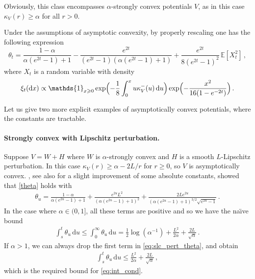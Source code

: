 \documentclass[12pt]{article}
\newcommand{\1}{\mathds{1}}
\newcommand*{\rd}{\mathrm{d}}
\newcommand*{\dd}{\, \rd}
\renewcommand{\geq}{\geqslant}
\renewcommand{\leq}{\leqslant}
\theoremstyle{plain}
\theoremstyle{definition}
\theoremstyle{remark}
\begin{document}
Obviously, this class encompasses $\alpha$-strongly convex potentials $V$, as in this case $\kappa_V(r) \geq \alpha$ for all $r > 0$.


Under the assumptions of asymptotic convexity, by properly rescaling \cite[Proposition 2.9]{chaintron_propagation_2025} one has the following expression
\[
\theta_t = \frac{1-\alpha}{\alpha(e^{2t}-1)+1} -\frac{e^{2t}}{(e^{2t}-1)(\alpha(e^{2t}-1)+1)} +\frac{e^{2t}}{8 (e^{2t}-1)^2}\, \mathbb{E}[X_t^2]\,,
\]
where $X_t$ is a random variable with density
$$\xi_t ({\rm d}x) \propto \mathds{1}_{x \geq 0} \exp \Bigl( -\frac{1}{8} \int_0^{x} u\kappa_{V}^- (u) \dd u \Bigr) \exp \Bigl( -\frac{x^2}{16 (1-e^{-2t})} \Bigr)\,. $$


Let us give two more explicit examples of asymptotically convex potentials, where the constants are tractable.

\paragraph{Strongly convex with Lipschitz perturbation.}
Suppose $V = W + H$ where $W$ is $\alpha$-strongly convex and $H$ is a smooth $L$-Lipschitz perturbation. In this case
$
\kappa_V(r) \geq \alpha - 2L/r
$
for $r\geq 0$, so $V$ is asymptotically convex.
\cite{BriPed25HeatFlow}, see also \cite{chaintron_propagation_2025} for a slight improvement of some absolute constants, showed that \eqref{theta} holds with 
\begin{align}\label{eq:slc_pert_theta}
    \theta_u = \frac{1-\alpha}{\alpha(e^{2u}-1)+1} + \frac{e^{2u}L^2}{(\alpha(e^{2u}-1)+1)^2}+ \frac{2Le^{2u}}{(\alpha(e^{2u}-1)+1)^{3/2}\sqrt{e^{2u}-1}}\,.
\end{align}
In the case where $\alpha \in (0,1]$, all these terms are positive and so we have the na\"{\i}ve bound
\begin{align*}
    \int_s^t \theta_u \dd u \leq \int_0^\infty \theta_u \dd u = \frac{1}{2}\log(\alpha^{-1}) + \frac{L^2}{2\alpha} + \frac{2L}{\sqrt{\alpha}}\,.
\end{align*}
If $\alpha > 1$, we can always drop the first term in \eqref{eq:slc_pert_theta}, and obtain
\begin{align*}
    \int_s^t \theta_u \dd u \leq \frac{L^2}{2\alpha} + \frac{2L}{\sqrt{\alpha}}\,,
\end{align*}
which is the required bound for \eqref{eq:int_cond}. 
\end{document}
